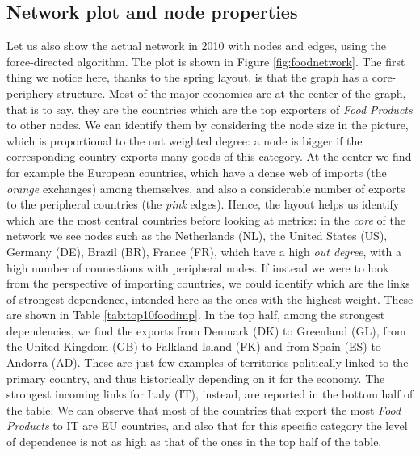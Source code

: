 \subsection{Network plot and node properties}

Let us also show the actual network in 2010 with nodes and edges, using the force-directed algorithm. The plot is shown in Figure \ref{fig:foodnetwork}. The first thing we notice here, thanks to the spring layout, is that the graph has a core-periphery structure. Most of the major economies are at the center of the graph, that is to say, they are the countries which are the top exporters of \textit{Food Products} to other nodes. We can identify them by considering the node size in the picture, which is proportional to the out weighted degree: a node is bigger if the corresponding country exports many goods of this category. At the center we find for example the European countries, which have a dense web of imports (the \textit{orange} exchanges) among themselves, and also a considerable number of exports to the peripheral countries (the \textit{pink} edges). Hence, the layout helps us identify which are the most central countries before looking at metrics: in the \textit{core} of the network we see nodes such as the Netherlands (NL), the United States (US), Germany (DE), Brazil (BR), France (FR), which have a high \textit{out degree}, with a high number of connections with peripheral nodes. If instead we were to look from the perspective of importing countries, we could identify which are the links of strongest dependence, intended here as the ones with the highest weight. These are shown in Table \ref{tab:top10foodimp}. In the top half, among the strongest dependencies, we find the exports from Denmark (DK) to Greenland (GL), from the United Kingdom (GB) to Falkland Island (FK) and from Spain (ES) to Andorra (AD). These are just few examples of territories politically linked to the primary country, and thus historically depending on it for the economy. The strongest incoming links for Italy (IT), instead, are reported in the bottom half of the table. We can observe that most of the countries that export the most \textit{Food Products} to IT are EU countries, and also that for this specific category the level of dependence is not as high as that of the ones in the top half of the table.



